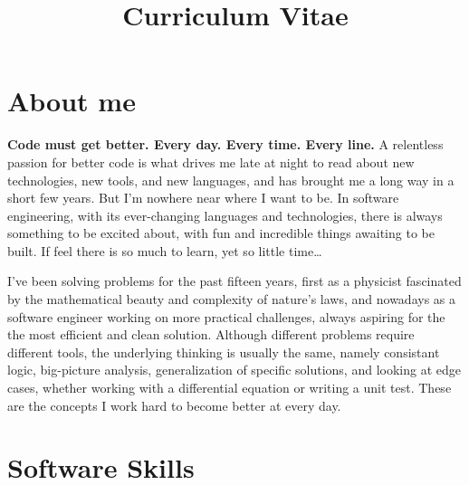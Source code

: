 \documentclass[11pt,a4paper,sans]{moderncv}        %
\title{Curriculum Vitae}                               %
\begin{document}
\makecvtitle

\section{About me}

    \textbf{Code must get better. Every day. Every time. Every line.} A relentless passion for better code is what drives
     me late at night to read about new technologies, new tools, and new languages, and has brought me a long way in a short few years.
     But I'm nowhere near where I want to be. In software engineering, with its ever-changing languages and technologies, there is always something to be excited about,
     with fun and incredible things awaiting to be built. If feel there is so much to learn, yet so little time\ldots \newline{}


    I've been solving problems for the past fifteen years, first as a physicist fascinated by the mathematical beauty and complexity of nature's laws, and nowadays as a software
    engineer working on more practical challenges, always aspiring for the the most efficient and clean solution. Although different problems require different tools, the underlying thinking
    is usually the same, namely consistant logic, big-picture analysis, generalization of specific solutions, and looking at edge cases, whether working with a
    differential equation or writing a unit test. These are the concepts I work hard to become better at every day.

\nopagebreak[4]

\section{Software Skills}
\end{document}
